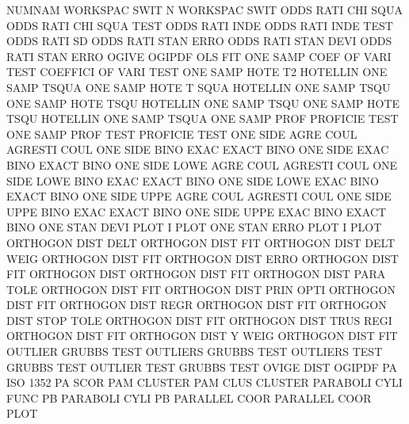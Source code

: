 NUMNAM                                  WORKSPAC SWIT
N                                       WORKSPAC SWIT
ODDS     RATI CHI  SQUA                 ODDS     RATI CHI  SQUA TEST
ODDS     RATI INDE                      ODDS     RATI INDE TEST
ODDS     RATI SD                        ODDS     RATI STAN ERRO
ODDS     RATI STAN DEVI                 ODDS     RATI STAN ERRO
OGIVE                                   OGIPDF
OLS                                     FIT
ONE      SAMP COEF OF   VARI TEST       COEFFICI OF   VARI TEST
ONE      SAMP HOTE T2                   HOTELLIN ONE  SAMP TSQUA
ONE      SAMP HOTE T    SQUA            HOTELLIN ONE  SAMP TSQU
ONE      SAMP HOTE TSQU                 HOTELLIN ONE  SAMP TSQU
ONE      SAMP HOTE TSQU                 HOTELLIN ONE  SAMP TSQUA
ONE      SAMP PROF                      PROFICIE TEST
ONE      SAMP PROF TEST                 PROFICIE TEST
ONE      SIDE AGRE COUL                 AGRESTI  COUL
ONE      SIDE BINO EXAC                 EXACT    BINO
ONE      SIDE EXAC BINO                 EXACT    BINO
ONE      SIDE LOWE AGRE COUL            AGRESTI  COUL
ONE      SIDE LOWE BINO EXAC            EXACT    BINO
ONE      SIDE LOWE EXAC BINO            EXACT    BINO
ONE      SIDE UPPE AGRE COUL            AGRESTI  COUL
ONE      SIDE UPPE BINO EXAC            EXACT    BINO
ONE      SIDE UPPE EXAC BINO            EXACT    BINO
ONE      STAN DEVI PLOT                 I        PLOT
ONE      STAN ERRO PLOT                 I        PLOT
ORTHOGON DIST DELT                      ORTHOGON DIST FIT
ORTHOGON DIST DELT WEIG                 ORTHOGON DIST FIT
ORTHOGON DIST ERRO                      ORTHOGON DIST FIT
ORTHOGON DIST                           ORTHOGON DIST FIT
ORTHOGON DIST PARA TOLE                 ORTHOGON DIST FIT
ORTHOGON DIST PRIN OPTI                 ORTHOGON DIST FIT
ORTHOGON DIST REGR                      ORTHOGON DIST FIT
ORTHOGON DIST STOP TOLE                 ORTHOGON DIST FIT
ORTHOGON DIST TRUS REGI                 ORTHOGON DIST FIT
ORTHOGON DIST Y    WEIG                 ORTHOGON DIST FIT
OUTLIER                                 GRUBBS   TEST
OUTLIERS                                GRUBBS   TEST
OUTLIERS TEST                           GRUBBS   TEST
OUTLIER  TEST                           GRUBBS   TEST
OVIGE    DIST                           OGIPDF
PA                                      ISO      1352 PA   SCOR
PAM                                     CLUSTER
PAM      CLUS                           CLUSTER
PARABOLI CYLI FUNC                      PB
PARABOLI CYLI                           PB
PARALLEL COOR                           PARALLEL COOR PLOT

